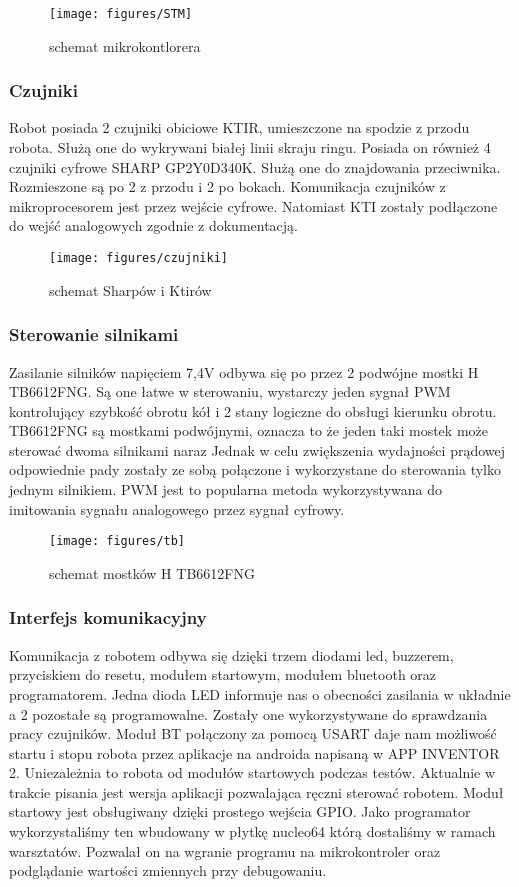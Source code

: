 \documentclass[12pt,a4paper]{article}
\begin{document}
\begin{figure}[!]
\centering
\texttt{[image: figures/STM]}
\caption{schemat mikrokontlorera  \label{fig:STM}}
\end{figure}


\subsubsection{Czujniki}
Robot posiada 2 czujniki obiciowe KTIR, umieszczone na spodzie z przodu robota. Służą one do wykrywani białej linii skraju ringu. Posiada on również 4 czujniki cyfrowe SHARP GP2Y0D340K. Służą one do znajdowania przeciwnika. Rozmieszone są po 2 z przodu i 2 po bokach. Komunikacja czujników z mikroprocesorem jest przez wejście cyfrowe. Natomiast KTI zostały podłączone do wejść analogowych zgodnie z dokumentacją.


\begin{figure}[!]
\centering
\texttt{[image: figures/czujniki]}
\caption{schemat Sharpów i Ktirów  \label{fig:czujniki}}
\end{figure}

\subsubsection{Sterowanie silnikami}
Zasilanie silników napięciem 7,4V  odbywa się po przez 2 podwójne mostki H TB6612FNG. Są one łatwe w sterowaniu, wystarczy jeden sygnał PWM kontrolujący szybkość obrotu kół i 2 stany logiczne do obsługi kierunku obrotu. TB6612FNG są mostkami podwójnymi, oznacza to że jeden taki mostek może sterować dwoma silnikami naraz Jednak w celu zwiększenia wydajności prądowej odpowiednie pady zostały ze sobą połączone i wykorzystane do sterowania tylko jednym silnikiem. PWM jest to popularna metoda wykorzystywana do imitowania sygnału analogowego przez sygnał cyfrowy.


\begin{figure}[!]
\centering
\texttt{[image: figures/tb]}
\caption{schemat mostków H TB6612FNG  \label{fig:tb}}
\end{figure}

\subsubsection{Interfejs komunikacyjny}
Komunikacja z robotem odbywa się dzięki trzem diodami led, buzzerem, przyciskiem do resetu, modułem startowym, modułem bluetooth oraz programatorem. Jedna dioda LED informuje nas o obecności zasilania w układnie a 2 pozostałe są programowalne. Zostały one wykorzystywane do sprawdzania pracy czujników. Moduł BT połączony za pomocą USART daje nam możliwość startu i stopu robota przez aplikacje na androida napisaną w APP INVENTOR 2. Uniezależnia to robota od modułów startowych podczas testów. Aktualnie w trakcie pisania jest wersja aplikacji pozwalająca ręczni sterować robotem. Moduł startowy jest obsługiwany dzięki prostego wejścia GPIO. Jako programator wykorzystaliśmy ten wbudowany w płytkę nucleo64 którą dostaliśmy w ramach warsztatów. Pozwalał on na wgranie programu na mikrokontroler oraz podglądanie wartości 
zmiennych przy debugowaniu.
\end{document}
